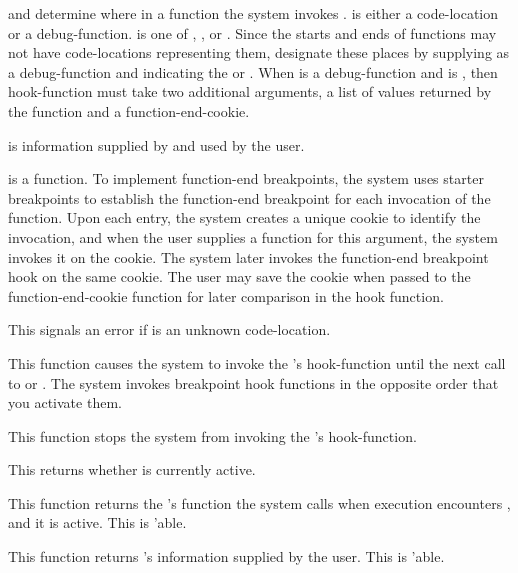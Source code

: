 { and  determine where in a function the system invokes
.   is either a code-location or a
debug-function.   is one of , 
, or .  Since the starts and ends of
functions may not have code-locations representing them, designate these places
by supplying  as a debug-function and  indicating the
 or .  When  is a
debug-function and  is , then hook-function must
take two additional arguments, a list of values returned by the function and a
function-end-cookie.

 is information supplied by and used by the user.

 is a function.  To implement function-end
breakpoints, the system uses starter breakpoints to establish the function-end
breakpoint for each invocation of the function.  Upon each entry, the system
creates a unique cookie to identify the invocation, and when the user supplies
a function for this argument, the system invokes it on the cookie.  The system
later invokes the function-end breakpoint hook on the same cookie.  The user
may save the cookie when passed to the function-end-cookie function for
later comparison in the hook function.

This signals an error if  is an unknown code-location.
\enddefun


This function causes the system to invoke the 's hook-function
until the next call to  or .
The system invokes breakpoint hook functions in the opposite order that you
activate them.
\enddefun


This function stops the system from invoking the 's
hook-function.
\enddefun


This returns whether  is currently active.
\enddefun


This function returns the 's function the system calls when
execution encounters , and it is active.  This is 
'able.
\enddefun


This function returns 's information supplied by the user.
This is 'able.
\enddefun


}
